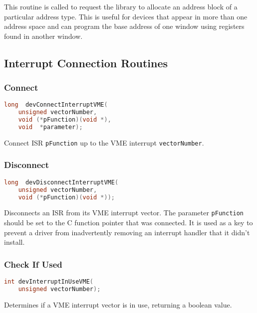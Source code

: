 This routine is called to request the library to allocate an address block of a particular address type. This is useful for 
devices that appear in more than one address space and can program the base address of one window using registers found 
in another window.

\subsection{Interrupt Connection Routines}

\subsubsection{Connect}

\begin{lstlisting}[language=C]
long  devConnectInterruptVME(
    unsigned vectorNumber,
    void (*pFunction)(void *),
    void  *parameter);
\end{lstlisting}

Connect ISR \verb|pFunction| up to the VME interrupt \verb|vectorNumber|.

\subsubsection{Disconnect}

\begin{lstlisting}[language=C]
long  devDisconnectInterruptVME(
    unsigned vectorNumber,
    void (*pFunction)(void *));
\end{lstlisting}

Disconnects an ISR from its VME interrupt vector. The parameter \verb|pFunction| should be set to the C function pointer 
that was connected. It is used as a key to prevent a driver from inadvertently removing an interrupt handler that it didn't 
install.

\subsubsection{Check If Used}

\begin{lstlisting}[language=C]
int devInterruptInUseVME(
    unsigned vectorNumber);
\end{lstlisting}

Determines if a VME interrupt vector is in use, returning a boolean value.


